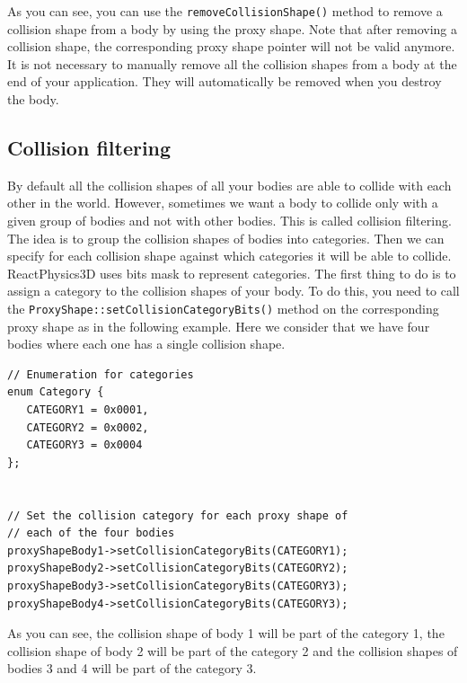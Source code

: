 \documentclass[a4paper,12pt]{article}
\begin{document}
    \vspace{0.6cm}

    As you can see, you can use the \texttt{removeCollisionShape()} method to remove a collision shape from a body by using the proxy shape. Note that
    after removing a collision shape, the corresponding proxy shape pointer will not be valid anymore. It is not necessary to manually remove all the collision shapes from
    a body at the end of your application. They will automatically be removed when you destroy the body.

    \subsection{Collision filtering}
    \label{sec:collisionfiltering}

    By default all the collision shapes of all your bodies are able to collide with each other in the world. However, sometimes we want a body to collide only with a given
    group of bodies and not with other bodies. This is called collision filtering. The idea is to group the collision shapes of bodies into categories. Then we can specify
    for each collision shape against which categories it will be able to collide. \\

    ReactPhysics3D uses bits mask to represent categories. The first thing to do is to assign a category to the collision shapes of your body. To do this, you need to
    call the \texttt{ProxyShape::setCollisionCategoryBits()} method on the corresponding proxy shape as in the following example. Here we consider that we have four bodies
    where each one has a single collision shape. \\

    \begin{lstlisting}
// Enumeration for categories
enum Category {
   CATEGORY1 = 0x0001,
   CATEGORY2 = 0x0002,
   CATEGORY3 = 0x0004
};


// Set the collision category for each proxy shape of
// each of the four bodies
proxyShapeBody1->setCollisionCategoryBits(CATEGORY1);
proxyShapeBody2->setCollisionCategoryBits(CATEGORY2);
proxyShapeBody3->setCollisionCategoryBits(CATEGORY3);
proxyShapeBody4->setCollisionCategoryBits(CATEGORY3);
  \end{lstlisting}

    \vspace{0.6cm}

    As you can see, the collision shape of body 1 will be part of the category 1, the collision shape of body 2 will be part of the category 2 and the collision shapes of bodies 3 and 4 will be
    part of the category 3. \\
\end{document}
